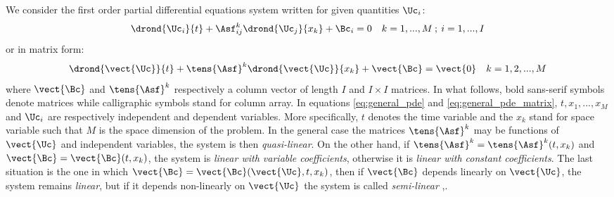 
We consider the first order partial differential equations system written for given quantities $\Uc_i$:
\begin{equation}
  \label{eq:general_pde}
  \drond{\Uc_i}{t} + \Asf^k_{ij}\drond{\Uc_j}{x_k} + \Bc_i= 0 \quad k=1,...,M \:;\: i=1,...,I
\end{equation}
or in matrix form:
\begin{equation}
  \label{eq:general_pde_matrix}
  \drond{\vect{\Uc}}{t} + \tens{\Asf}^k \drond{\vect{\Uc}}{x_k} + \vect{\Bc} = \vect{0}\quad k=1,2,...,M
\end{equation}
where $\vect{\Bc}$ and $\tens{\Asf}^k$ respectively a column vector of length $I$ and $I\times I$ matrices. In what follows, bold sans-serif symbols denote matrices while calligraphic symbols stand for column array. In equations \ref{eq:general_pde} and \ref{eq:general_pde_matrix}, $t,x_1,...,x_M$ and $\Uc_i$ are respectively independent and dependent variables. More specifically, $t$ denotes the time variable and the $x_k$ stand for space variable such that $M$ is the space dimension of the problem. In the general case the matrices $\tens{\Asf}^k$ may be functions of $\vect{\Uc}$ and independent variables, the system is then \textit{quasi-linear}. On the other hand, if $\tens{\Asf}^k=\tens{\Asf}^k(t,x_k)$ and $\vect{\Bc}=\vect{\Bc}(t,x_k)$, the system is \textit{linear with variable coefficients}, otherwise it is \textit{linear with constant coefficients}. The last situation is the one in which $\vect{\Bc}=\vect{\Bc}(\vect{\Uc},t,x_k)$, then if $\vect{\Bc}$ depends linearly on $\vect{\Uc}$, the system remains \textit{linear}, but if it depends non-linearly on $\vect{\Uc}$ the system is called \textit{semi-linear} \cite[Chapter~5]{Courant},\cite[Chapter~2]{Toro}.

